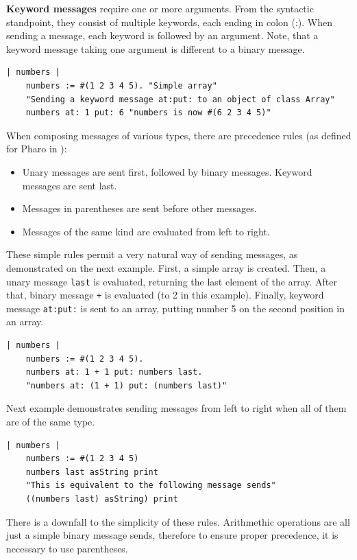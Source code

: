\documentclass[thesis=M,english]{FITthesis}[2019/12/23]
\begin{document}
\textbf{Keyword messages} require one or more arguments. From the syntactic standpoint, they consist of
multiple keywords, each ending in colon (:). When sending a message, each keyword is followed by an argument.
Note, that a keyword message taking one argument is different to a binary message.
\begin{lstlisting}[language=Smalltalk]
	| numbers |
	numbers := #(1 2 3 4 5). "Simple array"
	"Sending a keyword message at:put: to an object of class Array"
	numbers at: 1 put: 6 "numbers is now #(6 2 3 4 5)"
\end{lstlisting}

When composing messages of various types, there are precedence rules (as defined for Pharo in \cite{pharo-by-example}):
\begin{itemize}
	\item Unary messages are sent first, followed by binary messages. Keyword messages are sent last.
	\item Messages in parentheses are sent before other messages.
	\item Messages of the same kind are evaluated from left to right. 
\end{itemize}

These simple rules permit a very natural way of sending messages, as demonstrated on the next example.
First, a simple array is created. Then, a unary message \texttt{last} is evaluated, returning the last
element of the array. After that, binary message \texttt{+} is evaluated (to 2 in this example). Finally,
keyword message \texttt{at:put:} is sent to an array, putting number 5 on the second position in an array.
\begin{lstlisting}[language=Smalltalk]
	| numbers |
	numbers := #(1 2 3 4 5).
	numbers at: 1 + 1 put: numbers last.
	"numbers at: (1 + 1) put: (numbers last)"
\end{lstlisting}

Next example demonstrates sending messages from left to right when all of them are of the same type.
\begin{lstlisting}[language=Smalltalk]
	| numbers |
	numbers := #(1 2 3 4 5)
	numbers last asString print
	"This is equivalent to the following message sends"
	((numbers last) asString) print
\end{lstlisting}

There is a downfall to the simplicity of these rules. Arithmethic operations are all just a simple binary
message sends, therefore to ensure proper precedence, it is necessary to use parentheses.
\end{document}
